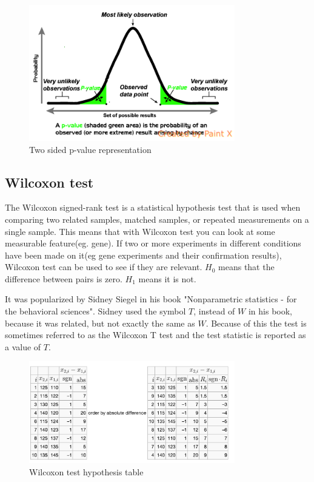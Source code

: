 \documentclass[12pt]{article}
\begin{document}
\begin{figure}[!h]
  \centering
  \includegraphics[width=0.8\textwidth]{p_value_two_sided}
  \caption{Two sided p-value representation}
  \label{fig:p_value_two_sided(Modified by author, source from Wikipedia Foundation inc, Repapetilto)}
\end{figure}

\subsection{Wilcoxon test}

The Wilcoxon signed-rank test is a statistical hypothesis test that is used when comparing two related samples, matched samples, or repeated measurements on a single sample. This means that with Wilcoxon test you can look at some measurable feature(eg. gene). If two or more experiments in different conditions have been made on it(eg gene experiments and their confirmation results), Wilcoxon test can be used to see if they are relevant. $H_0$ means that the difference between pairs is zero. $H_1$ means it is not.

It was popularized by Sidney Siegel in his book "Nonparametric statistics - for the behavioral sciences". Sidney used the symbol $T$, instead of $W$ in his book, because it was related, but not exactly the same as $W$. Because of this the test is sometimes referred to as the Wilcoxon T test and the test statistic is reported as a value of $T$.

\begin{figure}[!h]
  \centering
  \includegraphics[width=0.8\textwidth]{wilcoxon_test_intro}
  \caption{Wilcoxon test hypothesis table}
  \label{fig:wilcoxon_test_intro}
\end{figure}
\end{document}
